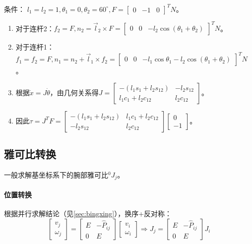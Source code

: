\documentclass[
12pt, %
a4paper, 
oneside, %
headinclude,footinclude, %
]{scrartcl}
\begin{document}
{\footnotesize
条件： $ l_1 = l_2 = 1, \theta_1 = 0, \theta_2 = 60^\circ, F = \begin{bmatrix} 0 & -1 & 0 \end{bmatrix}^T N $。
\begin{enumerate}
\item 对于连杆2：$ f_2 = F, n_2 = \vec{l}_2 \times F = \begin{bmatrix} 0 & 0 & -l_2 \cos(\theta_1 + \theta_2) \end{bmatrix}^T N $。
\item 对于连杆1：$ f_1 = f_2 = F, n_1 = n_2 + \vec{l}_1 \times f_2 = \begin{bmatrix} 0 & 0 & -l_1 \cos\theta_1 - l_2 \cos(\theta_1 + \theta_2) \end{bmatrix}^T N $。
\item 根据$ \dot{x} = J \dot{\theta} $，由几何关系得$ J = \begin{bmatrix} -(l_1 s_1 + l_2 s_{12}) & -l_2 s_{12} \\ l_1 c_1 + l_2 c_{12} & l_2 c_{12} \end{bmatrix} $。
\item 因此$ \tau = J^T F = \begin{bmatrix} -(l_1 s_1 + l_2 s_{12}) & l_1 c_1 + l_2 c_{12} \\ - l_2 s_{12} & l_2 c_{12} \end{bmatrix} \begin{bmatrix} 0 \\ -1 \end{bmatrix} $。
\end{enumerate}
}
\subsection[雅可比转换]{雅可比转换}\label{sec:Jacobian transform}\label{sec:bingxing_back1}
一般求解基坐标系下的腕部雅可比$ ^0 J_j $。
\paragraph{位置转换}
根据并行求解结论（见\ref{sec:bingxing}），换序+反对称：
$$ 
\begin{bmatrix} v_j \\ \omega_j \end{bmatrix} 
= \begin{bmatrix} E & -\hat{P}_{ij} \\ 0 & E \end{bmatrix} \begin{bmatrix} v_i \\ \omega_i \end{bmatrix} 
\Rightarrow J_j = \begin{bmatrix} E & -\hat{P}_{ij} \\ 0 & E \end{bmatrix} J_i
$$ 
\end{document}
